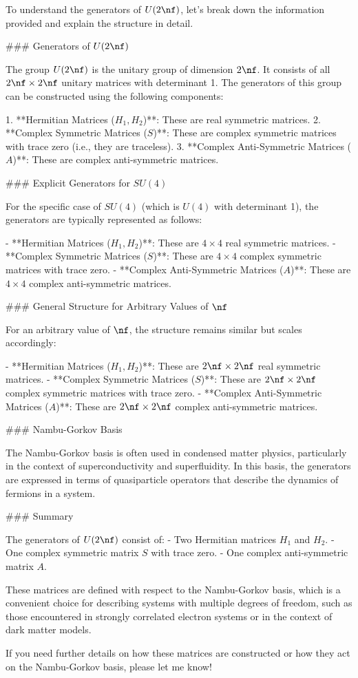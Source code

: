 To understand the generators of \( U(2\nf) \), let's break down the information provided and explain the structure in detail.

### Generators of \( U(2\nf) \)

The group \( U(2\nf) \) is the unitary group of dimension \( 2\nf \). It consists of all \( 2\nf \times 2\nf \) unitary matrices with determinant 1. The generators of this group can be constructed using the following components:

1. **Hermitian Matrices (\( H_1, H_2 \))**: These are real symmetric matrices.
2. **Complex Symmetric Matrices (\( S \))**: These are complex symmetric matrices with trace zero (i.e., they are traceless).
3. **Complex Anti-Symmetric Matrices (\( A \))**: These are complex anti-symmetric matrices.

### Explicit Generators for \( SU(4) \)

For the specific case of \( SU(4) \) (which is \( U(4) \) with determinant 1), the generators are typically represented as follows:

- **Hermitian Matrices (\( H_1, H_2 \))**: These are \( 4 \times 4 \) real symmetric matrices.
- **Complex Symmetric Matrices (\( S \))**: These are \( 4 \times 4 \) complex symmetric matrices with trace zero.
- **Complex Anti-Symmetric Matrices (\( A \))**: These are \( 4 \times 4 \) complex anti-symmetric matrices.

### General Structure for Arbitrary Values of \( \nf \)

For an arbitrary value of \( \nf \), the structure remains similar but scales accordingly:

- **Hermitian Matrices (\( H_1, H_2 \))**: These are \( 2\nf \times 2\nf \) real symmetric matrices.
- **Complex Symmetric Matrices (\( S \))**: These are \( 2\nf \times 2\nf \) complex symmetric matrices with trace zero.
- **Complex Anti-Symmetric Matrices (\( A \))**: These are \( 2\nf \times 2\nf \) complex anti-symmetric matrices.

### Nambu-Gorkov Basis

The Nambu-Gorkov basis is often used in condensed matter physics, particularly in the context of superconductivity and superfluidity. In this basis, the generators are expressed in terms of quasiparticle operators that describe the dynamics of fermions in a system.

### Summary

The generators of \( U(2\nf) \) consist of:
- Two Hermitian matrices \( H_1 \) and \( H_2 \).
- One complex symmetric matrix \( S \) with trace zero.
- One complex anti-symmetric matrix \( A \).

These matrices are defined with respect to the Nambu-Gorkov basis, which is a convenient choice for describing systems with multiple degrees of freedom, such as those encountered in strongly correlated electron systems or in the context of dark matter models.

If you need further details on how these matrices are constructed or how they act on the Nambu-Gorkov basis, please let me know!